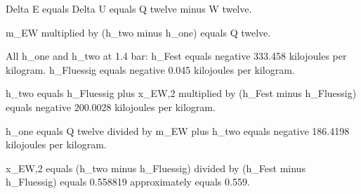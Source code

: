 Delta E equals Delta U equals Q twelve minus W twelve.  

m_EW multiplied by (h_two minus h_one) equals Q twelve.  

All h_one and h_two at 1.4 bar:  
h_Fest equals negative 333.458 kilojoules per kilogram.  
h_Fluessig equals negative 0.045 kilojoules per kilogram.  

h_two equals h_Fluessig plus x_EW,2 multiplied by (h_Fest minus h_Fluessig) equals negative 200.0028 kilojoules per kilogram.  

h_one equals Q twelve divided by m_EW plus h_two equals negative 186.4198 kilojoules per kilogram.  

x_EW,2 equals (h_two minus h_Fluessig) divided by (h_Fest minus h_Fluessig) equals 0.558819 approximately equals 0.559.